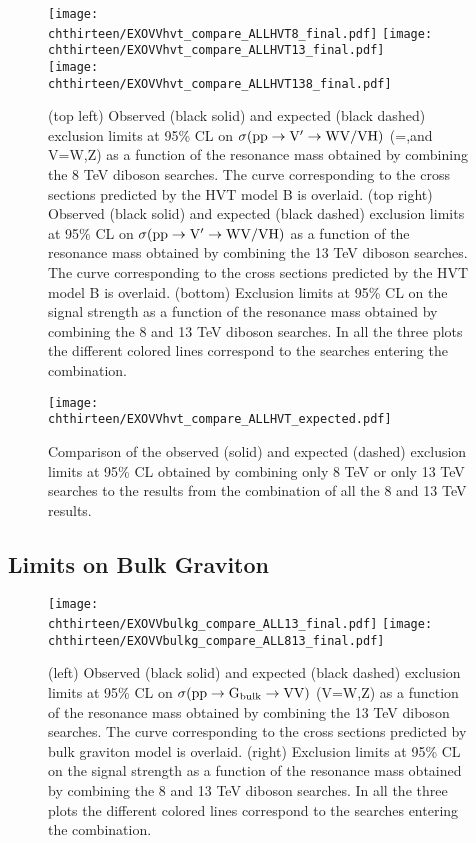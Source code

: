 \begin{figure}[htbp]
\centering
\texttt{[image: \\chthirteen/EXOVVhvt\_compare\_ALLHVT8\_final.pdf]}%
\texttt{[image: \\chthirteen/EXOVVhvt\_compare\_ALLHVT13\_final.pdf]} \\
\texttt{[image: \\chthirteen/EXOVVhvt\_compare\_ALLHVT138\_final.pdf]}%
\caption{
(top left) Observed (black solid) and expected (black dashed) exclusion limits at 95\% CL on $\sigma( \rm pp \to \mathrm{V}^\prime \to WV/VH)$ (\PVpr=\PWpr,\PZpr and V=W,Z) as a function of the resonance mass obtained by combining the 8 TeV diboson searches. The curve corresponding to the cross sections predicted by the HVT model B is overlaid. (top right) Observed (black solid) and expected (black dashed) exclusion limits at 95\% CL on $\sigma( \rm pp \to \mathrm{V}^\prime \to WV/VH)$ as a function of the resonance mass obtained by combining the 13 TeV diboson searches. The curve corresponding to the cross sections predicted by the HVT model B is overlaid. (bottom) Exclusion limits at 95\% CL on the signal strength as a function of the resonance mass obtained by combining the 8 and 13 TeV diboson searches. In all the three plots the different colored lines correspond to the searches entering the combination.
}
\label{fig:hvtall_138TeV}
\end{figure}

\begin{figure}[htbp]
\centering
\texttt{[image: \\chthirteen/EXOVVhvt\_compare\_ALLHVT\_expected.pdf]}
\caption{%
Comparison of the observed (solid) and expected (dashed) exclusion limits at 95\% CL obtained by combining only 8 TeV or only 13 TeV searches to the results from the combination of all the 8 and 13 TeV results.}
\label{fig:hvtall_compare}
\end{figure}

\subsection{Limits on Bulk Graviton}

\begin{figure}[htbp]
\centering
\texttt{[image: \\chthirteen/EXOVVbulkg\_compare\_ALL13\_final.pdf]}%
\texttt{[image: \\chthirteen/EXOVVbulkg\_compare\_ALL813\_final.pdf]}
\caption{
(left) Observed (black solid) and expected (black dashed) exclusion limits at 95\% CL on $\sigma( \rm pp \to G_{bulk} \to VV)$ (V=W,Z) as a function of the resonance mass obtained by combining the 13 TeV diboson searches. The curve corresponding to the cross sections predicted by bulk graviton model is overlaid. (right) Exclusion limits at 95\% CL on the signal strength as a function of the resonance mass obtained by combining the 8 and 13 TeV diboson searches. In all the three plots the different colored lines correspond to the searches entering the combination.}
\label{fig:bulkgall_138TeV}
\end{figure}

